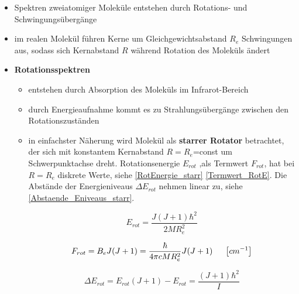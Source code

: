 \label{q:43}

\begin{itemize}
    \item Spektren zweiatomiger Moleküle entstehen durch Rotations- und Schwingungsübergänge
    \item im realen Molekül führen Kerne um Gleichgewichtsabstand $R_e$ Schwingungen aus, sodass sich Kernabstand $R$ während Rotation des Moleküls ändert
    \item \textbf{Rotationsspektren}
        \begin{itemize}
            \item entstehen durch Absorption des Moleküls im Infrarot-Bereich
            \item durch Energieaufnahme kommt es zu Strahlungsübergänge zwischen den Rotationszuständen
            \item in einfachster Näherung wird Molekül als \textbf{starrer Rotator} betrachtet, der sich mit konstantem Kernabstand $R=R_e$=const um Schwerpunktachse dreht. Rotationsenergie $E_{rot}$ ,als Termwert $F_{rot}$, hat bei $R=R_e$ diskrete Werte, siehe \ref{RotEnergie_starr} \ref{Termwert_RotE}. Die Abstände der Energieniveaus $\Delta E_{rot}$ nehmen linear zu, siehe \ref{Abstaende_Eniveaus_starr}.

                \begin{equation}
                E_{rot} = \frac{J(J+1)\hbar^2}{2MR_e^2}
                \label{RotEnergie_starr}
                \end{equation}

                \begin{equation}
                F_{rot} =B_eJ(J+1)=\frac{\hbar}{4\pi cMR_e^2}J(J+1) \hspace{5mm} \left[cm^{-1}\right]
                \label{Termwert_RotE}
                \end{equation}

                \begin{equation}
                \Delta E_{rot}=E_{rot}(J+1)-E_{rot}=\frac{(J+1)\hbar^2}{I}
                \label{Abstaende_Eniveaus_starr}
                \end{equation}


\end{itemize}
\end{itemize}
